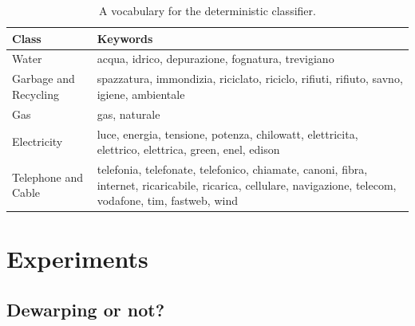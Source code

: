 \documentclass[10pt,twocolumn,letterpaper]{article}
\begin{document}
\bgroup
\def\arraystretch{1.3}%
\begin{table}[!h]
  \begin{center}
    \begin{tabular}{p{2cm} p{5cm}}
      \hline
      Class                 & Keywords                                                                                                                                                    \\ \hline
      Water                 & acqua, idrico, depurazione, fognatura, trevigiano                                                                                                           \\
      Garbage and Recycling & spazzatura, immondizia, riciclato, riciclo, rifiuti, rifiuto, savno, igiene, ambientale                                                                     \\
      Gas                   & gas, naturale                                                                                                                                               \\
      Electricity           & luce, energia, tensione, potenza, chilowatt, elettricita, elettrico, elettrica, green, enel, edison                                                         \\
      Telephone and Cable   & telefonia, telefonate, telefonico, chiamate, canoni, fibra, internet, ricaricabile, ricarica, cellulare, navigazione, telecom, vodafone, tim, fastweb, wind \\ \hline
    \end{tabular}
  \end{center}
  \label{table:determnistic-classifier-dict}
  \caption{A vocabulary for the deterministic classifier.}
\end{table}
\egroup

\section{Experiments}
\label{sec:experiments}

\subsection{Dewarping or not?}
\label{subsec:dewarping-or-not}
\end{document}
